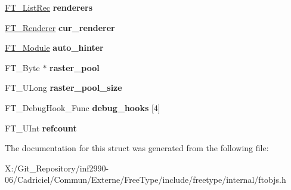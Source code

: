 \begin{DoxyCompactItemize}
\item 
\hypertarget{struct_f_t___library_rec___ad9503f71cf4e4d88edfbdda59eb5e43d}{\hyperlink{struct_f_t___list_rec__}{F\-T\-\_\-\-List\-Rec} {\bfseries renderers}}\label{struct_f_t___library_rec___ad9503f71cf4e4d88edfbdda59eb5e43d}

\item 
\hypertarget{struct_f_t___library_rec___a528dd3298756070ecad7d0f82f009294}{\hyperlink{struct_f_t___renderer_rec__}{F\-T\-\_\-\-Renderer} {\bfseries cur\-\_\-renderer}}\label{struct_f_t___library_rec___a528dd3298756070ecad7d0f82f009294}

\item 
\hypertarget{struct_f_t___library_rec___ae608b33b223905d4d70b782ed7ec8c78}{\hyperlink{struct_f_t___module_rec__}{F\-T\-\_\-\-Module} {\bfseries auto\-\_\-hinter}}\label{struct_f_t___library_rec___ae608b33b223905d4d70b782ed7ec8c78}

\item 
\hypertarget{struct_f_t___library_rec___aa8dd799d2efb7817b05c4a02a6828275}{F\-T\-\_\-\-Byte $\ast$ {\bfseries raster\-\_\-pool}}\label{struct_f_t___library_rec___aa8dd799d2efb7817b05c4a02a6828275}

\item 
\hypertarget{struct_f_t___library_rec___a798afdcaf0cda349eb454b769abfa251}{F\-T\-\_\-\-U\-Long {\bfseries raster\-\_\-pool\-\_\-size}}\label{struct_f_t___library_rec___a798afdcaf0cda349eb454b769abfa251}

\item 
\hypertarget{struct_f_t___library_rec___a1ba1f5abd0254a22dae533a9ac971b84}{F\-T\-\_\-\-Debug\-Hook\-\_\-\-Func {\bfseries debug\-\_\-hooks} \mbox{[}4\mbox{]}}\label{struct_f_t___library_rec___a1ba1f5abd0254a22dae533a9ac971b84}

\item 
\hypertarget{struct_f_t___library_rec___aad71b1ecfaea56594fbd21c18e72f15c}{F\-T\-\_\-\-U\-Int {\bfseries refcount}}\label{struct_f_t___library_rec___aad71b1ecfaea56594fbd21c18e72f15c}

\end{DoxyCompactItemize}


The documentation for this struct was generated from the following file\-:\begin{DoxyCompactItemize}
\item 
X\-:/\-Git\-\_\-\-Repository/inf2990-\/06/\-Cadriciel/\-Commun/\-Externe/\-Free\-Type/include/freetype/internal/ftobjs.\-h\end{DoxyCompactItemize}
